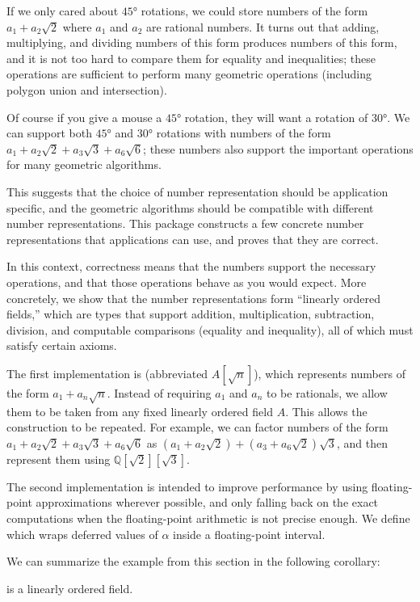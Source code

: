 If we only cared about $45°$ rotations, we could store numbers of the
form $a_1 + a_2\sqrt{2}$ where $a_1$ and $a_2$ are rational numbers. It
turns out that adding, multiplying, and dividing numbers of this form produces
numbers of this form, and it is not too hard to compare them for equality and
inequalities; these operations are sufficient to perform many geometric
operations (including polygon union and intersection).

Of course if you give a mouse a $45°$ rotation, they will want a
rotation of $30°$. We can support both $45°$ and $30°$
rotations with numbers of the form
$a_1 + a_2\sqrt{2} + a_3\sqrt{3} + a_6\sqrt{6}$; these numbers also support the
important operations for many geometric algorithms.

This suggests that the choice of number representation should be application
specific, and the geometric algorithms should be compatible with different
number representations. This package constructs a few concrete number
representations that applications can use, and proves that they are correct.

In this context, correctness means that the numbers support the necessary
operations, and that those operations behave as you would expect. More
concretely, we show that the number representations form ``linearly ordered
fields,'' which are types that support addition, multiplication, subtraction,
division, and computable comparisons (equality and inequality), all of which
must satisfy certain axioms.

The first implementation is  (abbreviated $A[\sqrt{n}]$),
which represents numbers of the form $a_1 + a_n\sqrt{n}$. Instead of requiring
$a_1$ and $a_n$ to be rationals, we allow them to be taken from any fixed
linearly ordered field $A$.  This allows the construction to be repeated. For
example, we can factor numbers of the form $a_1 + a_2\sqrt{2} + a_3\sqrt{3} +
a_6\sqrt{6}$ as $(a_1 + a_2\sqrt{2}) + (a_3 + a_6\sqrt{2})\sqrt{3}$, and then
represent them using $ℚ[\sqrt{2}][\sqrt{3}]$.

The second implementation is intended to improve performance by using
floating-point approximations wherever possible, and only falling back on the
exact computations when the floating-point arithmetic is not precise enough. We
define  which wraps deferred values of $α$
inside a floating-point interval.

We can summarize the example from this section in the following corollary:
\begin{corollary}
  \label{thm:numberType}
   is a linearly ordered field.
\end{corollary}

